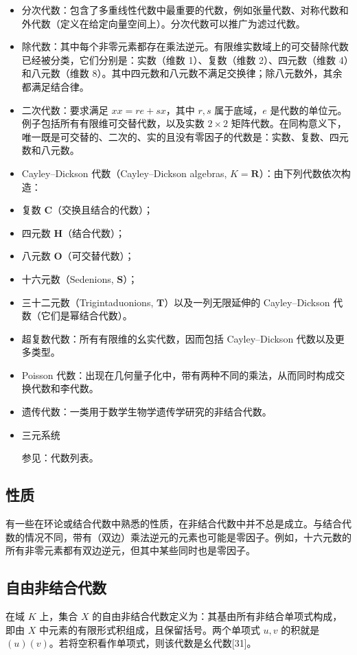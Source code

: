 \begin{itemize}
\item 分次代数：包含了多重线性代数中最重要的代数，例如张量代数、对称代数和外代数（定义在给定向量空间上）。分次代数可以推广为滤过代数。
\item 除代数：其中每个非零元素都存在乘法逆元。有限维实数域上的可交替除代数已经被分类，它们分别是：实数（维数 1）、复数（维数 2）、四元数（维数 4）和八元数（维数 8）。其中四元数和八元数不满足交换律；除八元数外，其余都满足结合律。
\item 二次代数：要求满足 $xx = re + sx$，其中 $r, s$ 属于底域，$e$ 是代数的单位元。例子包括所有有限维可交替代数，以及实数 $2 \times 2$ 矩阵代数。在同构意义下，唯一既是可交替的、二次的、实的且没有零因子的代数是：实数、复数、四元数和八元数。
\item Cayley–Dickson 代数（Cayley–Dickson algebras, $K=\mathbf{R}$）：由下列代数依次构造：
\item 复数 $\mathbf{C}$（交换且结合的代数）；
\item 四元数 $\mathbf{H}$（结合代数）；
\item 八元数 $\mathbf{O}$（可交替代数）；
\item 十六元数（Sedenions, $\mathbf{S}$）；
\item 三十二元数（Trigintaduonions, $\mathbf{T}$）以及一列无限延伸的 Cayley–Dickson 代数（它们是幂结合代数）。
\item 超复数代数：所有有限维的幺实代数，因而包括 Cayley–Dickson 代数以及更多类型。
\item Poisson 代数：出现在几何量子化中，带有两种不同的乘法，从而同时构成交换代数和李代数。
\item 遗传代数：一类用于数学生物学遗传学研究的非结合代数。
\item 三元系统

参见：代数列表。
\end{itemize}
\subsection{性质}
有一些在环论或结合代数中熟悉的性质，在非结合代数中并不总是成立。与结合代数的情况不同，带有（双边）乘法逆元的元素也可能是零因子。例如，十六元数的所有非零元素都有双边逆元，但其中某些同时也是零因子。
\subsection{自由非结合代数}
在域 $K$ 上，集合 $X$ 的自由非结合代数定义为：其基由所有非结合单项式构成，即由 $X$ 中元素的有限形式积组成，且保留括号。两个单项式 $u, v$ 的积就是 $(u)(v)$。若将空积看作单项式，则该代数是幺代数[31]。

